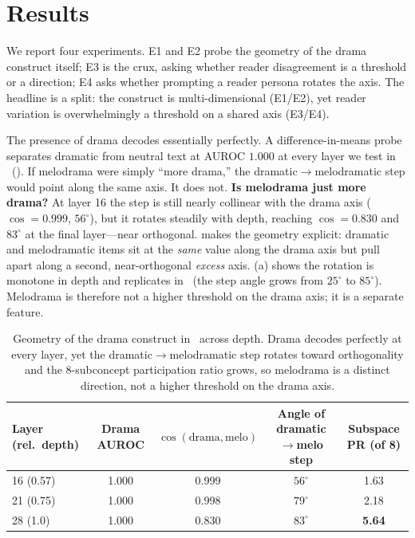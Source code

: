 \section{Results}\label{sec:results}

We report four experiments. E1 and E2 probe the geometry of the drama construct itself; E3 is the crux, asking whether reader disagreement is a threshold or a direction; E4 asks whether prompting a reader persona rotates the axis. The headline is a split: the construct is multi-dimensional (E1/E2), yet reader variation is overwhelmingly a threshold on a shared axis (E3/E4).

 The presence of drama decodes essentially perfectly. A difference-in-means probe separates dramatic from neutral text at AUROC $1.000$ at every layer we test in \qwenbig\ (). If melodrama were simply ``more drama,'' the dramatic$\to$melodramatic step would point along the same axis. It does not. {\bf Is melodrama just more drama?} At layer 16 the step is still nearly collinear with the drama axis ($\cos=0.999$, $56^\circ$), but it rotates steadily with depth, reaching $\cos=0.830$ and $83^\circ$ at the final layer---near orthogonal.  makes the geometry explicit: dramatic and melodramatic items sit at the {\em same} value along the drama axis but pull apart along a second, near-orthogonal {\em excess} axis. (a) shows the rotation is monotone in depth and replicates in \qwensmall\ (the step angle grows from $25^\circ$ to $85^\circ$). Melodrama is therefore not a higher threshold on the drama axis; it is a separate feature.

\begin{table}[t]\centering
\caption{Geometry of the drama construct in \qwenbig\ across depth. Drama decodes perfectly at every layer, yet the dramatic$\to$melodramatic step rotates toward orthogonality and the 8-subconcept participation ratio grows, so melodrama is a distinct direction, not a higher threshold on the drama axis.}
\label{tab:e1}
\begin{tabular}{@{}lcccc@{}}\toprule
Layer (rel.\ depth) & Drama AUROC & $\cos(\text{drama},\text{melo})$ & Angle of dramatic$\to$melo step & Subspace PR (of 8) \\\midrule
16 (0.57) & 1.000 & 0.999 & $56^\circ$ & 1.63 \\
21 (0.75) & 1.000 & 0.998 & $79^\circ$ & 2.18 \\
28 (1.0) & 1.000 & 0.830 & \textbf{$83^\circ$} & \textbf{5.64} \\
\bottomrule\end{tabular}\end{table}

